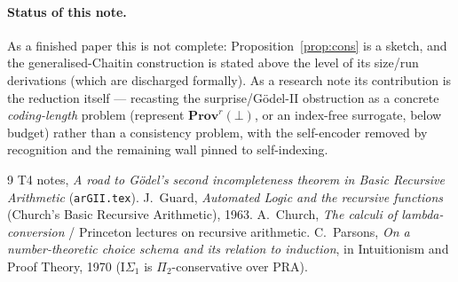 \documentclass[11pt]{article}
\theoremstyle{plain}
\theoremstyle{definition}
\theoremstyle{remark}
\newcommand{\Prov}{\mathbf{Prov}}
\begin{document}
\paragraph{Status of this note.}
As a finished paper this is not complete: Proposition~\ref{prop:cons} is a sketch,
and the generalised-Chaitin construction is stated above the level of its
size/run derivations (which are discharged formally). As a research note its
contribution is the reduction itself --- recasting the surprise/G\"odel-II
obstruction as a concrete \emph{coding-length} problem (represent
$\Prov^r(\bot)$, or an index-free surrogate, below budget) rather than a
consistency problem, with the self-encoder removed by recognition and the
remaining wall pinned to self-indexing.

\begin{thebibliography}{9}
 T4 notes, \emph{A road to G\"odel's second incompleteness theorem in Basic Recursive Arithmetic} (\texttt{arGII.tex}).
 J.~Guard, \emph{Automated Logic and the recursive functions} (Church's Basic Recursive Arithmetic), 1963.
 A.~Church, \emph{The calculi of lambda-conversion} / Princeton lectures on recursive arithmetic.
 C.~Parsons, \emph{On a number-theoretic choice schema and its relation to induction}, in Intuitionism and Proof Theory, 1970 ($\mathrm{I}\Sigma_1$ is $\Pi_2$-conservative over PRA).
\end{thebibliography}
\end{document}
